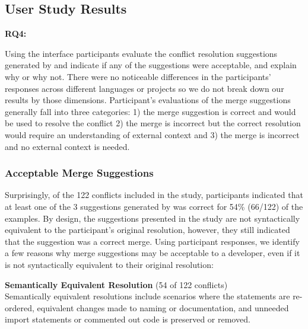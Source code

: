 



\subsection{User Study Results}


\noindent \textbf{RQ\scriptsize{4}: }\textbf{\rqFour}


Using the interface participants evaluate the conflict resolution suggestions generated by \thistool{} and indicate if any of the suggestions were acceptable, and explain why or why not. There were no noticeable differences in the participants' responses across different languages or projects so we do not break down our results by those dimensions.
Participant's evaluations of the merge suggestions generally fall into three categories: 1) the merge suggestion is correct and would be used to resolve the conflict 2) the merge is incorrect but the correct resolution would require an understanding of external context and 3) the merge is incorrect and no external context is needed.  

\subsubsection{Acceptable Merge Suggestions}

Surprisingly, of the 122 conflicts included in the study, participants indicated that at least one of the 3 suggestions generated by \thistool{} was correct for 54\% (66/122) of the examples. By design, the suggestions presented in the study are not syntactically equivalent to the participant's original resolution, however, they still indicated that the suggestion was a correct merge. Using participant responses, we identify a few reasons why merge suggestions may be acceptable to a developer, even if it is not syntactically equivalent to their original resolution:

\vspace{6pt}
\noindent{}\textbf{Semantically Equivalent Resolution} (54 of 122 conflicts) \\
    Semantically equivalent resolutions include scenarios where the statements are re-ordered, equivalent changes made to naming or documentation, and unneeded import statements or commented out code is  preserved or removed. 
   

